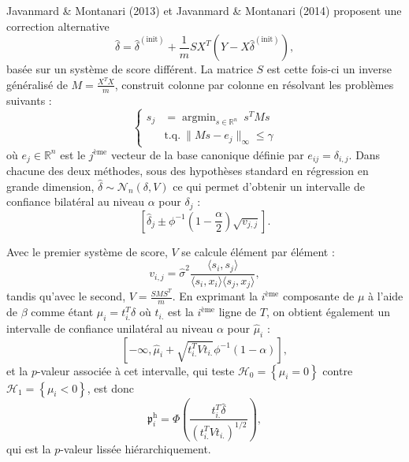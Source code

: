 \documentclass[12pt,a4paper]{reedthesis}
\newcommand \RR {\mathbb{R}}
\newcommand \pv {\mathfrak{p}}
\newcommand \shifts {\delta}
\newcommand \optim {\beta}
\DeclareMathOperator*{\argmin}{argmin}
\theoremstyle{definition}
\theoremstyle{definition}
\theoremstyle{definition}
\theoremstyle{remark}
\begin{document}
Javanmard \& Montanari (2013) et Javanmard \& Montanari (2014) proposent une correction alternative
\begin{equation*}
\hat{\shifts} = \hat{\shifts}^{(\text{init})} + \frac{1}{m}SX^T \left(Y-X\hat{\shifts}^{(\text{init})}\right),
\end{equation*}
basée sur un système de score différent. La matrice \(S\) est cette fois-ci un inverse généralisé de \(M = \frac{X^TX}{m}\), construit colonne par colonne en résolvant les problèmes suivants :
\begin{equation*}
\left\{
  \begin{aligned}
    s_j & = \argmin_{s \in \mathbb{R}^{n}} \ s^TMs \\
    &\text{t.q.}\  \|Ms - e_j\|_{\infty} \leq \gamma
  \end{aligned}
\right.
\end{equation*}
où \(e_j \in \RR^n\) est le \(j^{\text{ème}}\) vecteur de la base canonique définie par \(e_{ij} = \delta_{i,j}\). Dans chacune des deux méthodes, sous des hypothèses standard en régression en grande dimension, \(\hat{\shifts}\sim \mathcal{N}_n\left(\shifts,V\right)\) ce qui permet d'obtenir un intervalle de confiance bilatéral au niveau \(\alpha\) pour \(\shifts_j\) :
\begin{equation*}
\left[ \hat{\shifts}_j \pm \phi^{-1}\left(1-\frac{\alpha}{2}\right) \sqrt{v_{j,j}} \right].
\end{equation*}
\newline

Avec le premier système de score, \(V\) se calcule élément par élément :
\begin{equation*}
v_{i,j} = \hat{\sigma}^2 \frac{\langle s_i,s_j\rangle}{\langle s_i,x_i\rangle\langle s_j,x_j\rangle},
\end{equation*}
tandis qu'avec le second, \(V = \frac{S M S^T }{m}\). En exprimant la \(i^{\text{ème}}\) composante de \(\mu\) à l'aide de \(\optim\) comme étant \(\mu_i = t_{i.}^T\shifts\) où \(t_{i.}\) est la \(i^{\text{ème}}\) ligne de \(T\), on obtient également un intervalle de confiance unilatéral au niveau \(\alpha\) pour \(\hat{\mu}_i\) :
\begin{equation*}
\left[-\infty, \hat{\mu}_i + \sqrt{t_{i.}^T V t_{i.}} \phi^{-1}\left(1-\alpha\right)\right],
\end{equation*}
et la \(p\)-valeur associée à cet intervalle, qui teste \(\mathcal{H}_0 = \left\{\mu_i = 0\right\}\) contre \(\mathcal{H}_1 = \left\{\mu_i < 0\right\}\), est donc
\begin{equation*}
\pv^\text{h}_i = \Phi\left(\frac{t_{i.}^T\hat{\shifts}}{\left(t_{i.}^TVt_{i.}\right)^{1/2}}\right),
\end{equation*}
qui est la \(p\)-valeur lissée hiérarchiquement.
\end{document}
